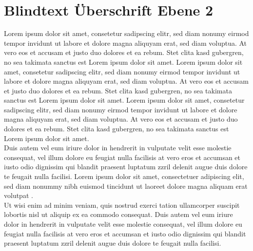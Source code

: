 \documentclass[
	ngerman,
	ruledheaders=section,%
	class=report,%
	thesis={type=bachelor},%
	accentcolor=1b,%
	custommargins=true,%
	marginpar=false,%
	parskip=half-,%
	fontsize=11pt,%
	DIV=14,
]{tudapub}
\begin{document}
\section{Blindtext Überschrift Ebene 2}
Lorem ipsum dolor sit amet, consetetur sadipscing elitr, sed diam nonumy eirmod tempor invidunt ut labore et dolore magna aliquyam erat, sed diam voluptua. At vero eos et accusam et justo duo dolores et ea rebum. Stet clita kasd gubergren, no sea takimata sanctus est Lorem ipsum dolor sit amet. Lorem ipsum dolor sit amet, consetetur sadipscing elitr, sed diam nonumy eirmod tempor invidunt ut labore et dolore magna aliquyam erat, sed diam voluptua. At vero eos et accusam et justo duo dolores et ea rebum. Stet clita kasd gubergren, no sea takimata sanctus est Lorem ipsum dolor sit amet. Lorem ipsum dolor sit amet, consetetur sadipscing elitr, sed diam nonumy eirmod tempor invidunt ut labore et dolore magna aliquyam erat, sed diam voluptua. At vero eos et accusam et justo duo dolores et ea rebum. Stet clita kasd gubergren, no sea takimata sanctus est Lorem ipsum dolor sit amet.\\
Duis autem vel eum iriure dolor in hendrerit in vulputate velit esse molestie consequat, vel illum dolore eu feugiat nulla facilisis at vero eros et accumsan et iusto odio dignissim qui blandit praesent luptatum zzril delenit augue duis dolore te feugait nulla facilisi. Lorem ipsum dolor sit amet, consectetuer adipiscing elit, sed diam nonummy nibh euismod tincidunt ut laoreet dolore magna aliquam erat volutpat \parencite{emse-03339298, koppe2021herausforderungen}.\\
Ut wisi enim ad minim veniam, quis nostrud exerci tation ullamcorper suscipit lobortis nisl ut aliquip ex ea commodo consequat. Duis autem vel eum iriure dolor in hendrerit in vulputate velit esse molestie consequat, vel illum dolore eu feugiat nulla facilisis at vero eros et accumsan et iusto odio dignissim qui blandit praesent luptatum zzril delenit augue duis dolore te feugait nulla facilisi.\\
\end{document}
